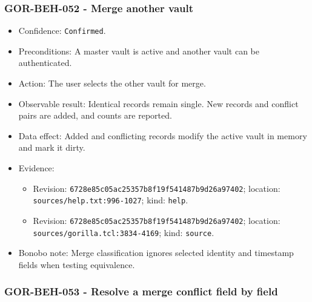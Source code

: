 \documentclass[
  letterpaper,
]{article}
\newcommand{\passthrough}[1]{#1}
\providecommand{\tightlist}{%
  \setlength{\itemsep}{0pt}\setlength{\parskip}{0pt}}
\begin{document}
\subsubsection{GOR-BEH-052 - Merge another vault}\label{gor-beh-052---merge-another-vault}

\begin{itemize}
\tightlist
\item
  Confidence: \passthrough{\lstinline!Confirmed!}.
\item
  Preconditions: A master vault is active and another vault can be authenticated.
\item
  Action: The user selects the other vault for merge.
\item
  Observable result: Identical records remain single. New records and conflict pairs are added, and counts are reported.
\item
  Data effect: Added and conflicting records modify the active vault in memory and mark it dirty.
\item
  Evidence:

  \begin{itemize}
  \tightlist
  \item
    Revision: \nolinkurl{6728e85c05ac25357b8f19f541487b9d26a97402}; location: \nolinkurl{sources/help.txt:996-1027};
    kind: \passthrough{\lstinline!help!}.
  \item
    Revision: \nolinkurl{6728e85c05ac25357b8f19f541487b9d26a97402}; location: \nolinkurl{sources/gorilla.tcl:3834-4169};
    kind: \passthrough{\lstinline!source!}.
  \end{itemize}
\item
  Bonobo note: Merge classification ignores selected identity and timestamp fields when testing equivalence.
\end{itemize}

\subsubsection{GOR-BEH-053 - Resolve a merge conflict field by
field}\label{gor-beh-053---resolve-a-merge-conflict-field-by-field}
\end{document}
